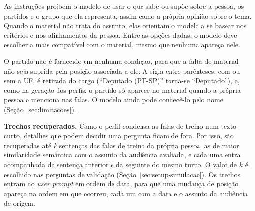 As instruções proíbem o modelo de usar o que sabe ou supõe sobre a pessoa, os partidos e o grupo que
ela representa, assim como a própria opinião sobre o tema. Quando o material não trata do assunto,
elas orientam o modelo a se basear nos critérios e nos alinhamentos da pessoa. Entre as opções
dadas, o modelo deve escolher a mais compatível com o material, mesmo que nenhuma apareça nele.

O partido não é fornecido em nenhuma condição, para que a falta de material não seja suprida pela
posição associada a ele. A sigla entre parênteses, com ou sem a UF, é retirada do cargo (``Deputado
(PT-SP)'' torna-se ``Deputado''), e, como na geração dos perfis, o partido só aparece no material
quando a própria pessoa o menciona nas falas. O modelo ainda pode conhecê-lo pelo nome
(Seção~\ref{sec:limitacoes}).

\textbf{Trechos recuperados.} Como o perfil condensa as falas de treino num texto curto, detalhes
que podem decidir uma pergunta ficam de fora. Por isso, são recuperadas até $k$ sentenças das falas
de treino da própria pessoa, as de maior similaridade semântica com o assunto da audiência avaliada,
e cada uma entra acompanhada da sentença anterior e da seguinte do mesmo turno. O valor de $k$ é
escolhido nas perguntas de validação (Seção~\ref{sec:setup-simulacao}). Os trechos entram no
\textit{user prompt} em ordem de data, para que uma mudança de posição apareça na ordem em que
ocorreu, cada um com a data e o assunto da audiência de origem.
